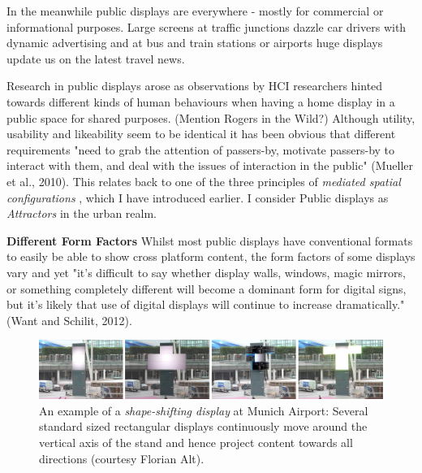 In the meanwhile public displays  are everywhere - mostly for commercial or informational purposes. Large screens at traffic junctions dazzle car drivers with dynamic advertising and at bus and train stations or airports huge displays update us on the latest travel news.  

Research in public displays  arose as observations by HCI researchers hinted towards different kinds of human behaviours when having a home display in a public space for shared purposes. 
(Mention Rogers in the Wild?)
Although utility, usability and likeability seem to be identical it has been obvious that different requirements "need to grab the attention of passers-by, motivate passers-by to interact with them, and deal with the issues of interaction in the public" (Mueller et al., 2010). 
This relates back to one of the three principles of \textit{mediated spatial configurations} , which I have introduced earlier. I consider Public displays as \textit{Attractors}  in the urban realm.  

\textbf{Different Form Factors}
Whilst most public displays have conventional formats to easily be able to show cross platform content, the form factors of some displays vary and yet "it’s difficult to say whether display walls, windows, magic mirrors, or something completely different will become a dominant form for digital signs, but it’s likely that use of digital displays will continue to increase dramatically." (Want and Schilit, 2012). 


\begin{figure}[htp]
  \centering
  \includegraphics[width=14cm]{Illustrations/ShapeShiftingDisplay.png}
  \caption[Shape-shifting displays]{An example of a \textit{shape-shifting display}  at Munich Airport: Several standard sized rectangular displays continuously move around the vertical axis of the stand and hence project content towards all directions (courtesy Florian Alt).}
  \label{SpatialConfig}
  \end{figure}

